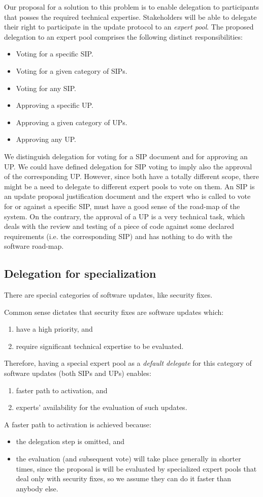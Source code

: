 \documentclass[11pt,a4paper]{article}
\begin{document}
Our proposal for a solution to this problem is to enable delegation to
participants that posses the required technical expertise.
%
Stakeholders will be able to delegate their right to participate in the update
protocol to an \emph{expert pool}. The proposed delegation to an expert pool
comprises the following distinct responsibilities:
\begin{itemize}
\item Voting for a specific SIP.
\item Voting for a given category of SIPs.
\item Voting for any SIP.
\item Approving a specific UP.
\item Approving a given category of UPs.
\item Approving any UP.
\end{itemize}
We distinguish delegation for voting for a SIP document and for approving an UP.
We could have defined delegation for SIP voting to imply also the approval of
the corresponding UP. However, since both have a totally different scope, there
might be a need to delegate to different expert pools to vote on them. An SIP is
an update proposal justification document and the expert who is called to vote
for or against a specific SIP, must have a good sense of the road-map of the
system. On the contrary, the approval of a UP is a very technical task, which
deals with the review and testing of a piece of code against some declared
requirements (i.e. the corresponding SIP) and has nothing to do with the
software road-map.

\subsection{Delegation for specialization}
\label{sec:deleg-spec}

There are special categories of software updates, like security fixes.

Common sense dictates that security fixes are software updates which:
\begin{enumerate}
\item have a high priority, and
\item require significant technical expertise to be evaluated.
\end{enumerate}
Therefore, having a special expert pool as a \emph{default delegate} for this
category of software updates (both SIPs and UPs) enables:
\begin{enumerate}
\item faster path to activation, and
\item experts' availability for the evaluation of such updates.
\end{enumerate}
A faster path to activation is achieved because:
\begin{itemize}
\item the delegation step is omitted, and
\item the evaluation (and subsequent vote) will take place generally in shorter
  times, since the proposal is will be evaluated by specialized expert pools that
  deal only with security fixes, so we assume they can do it faster than anybody
  else.
\end{itemize}
\end{document}
